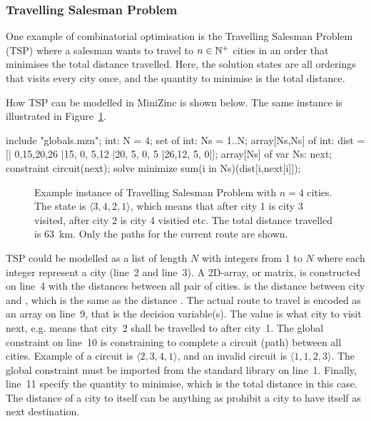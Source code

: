 \documentclass[a4paper,12pt]{article}
\begin{document}
\subsubsection{Travelling Salesman Problem}\label{sec:tsp}

One example of combinatorial optimisation is the Travelling Salesman Problem (TSP) where a
salesman wants to travel to $n \in \mathbb{N}^+$ cities in an order that minimises the total
distance travelled. Here, the solution states are all orderings that visits every city once, and the
quantity to minimise is the total distance.

How TSP can be modelled in MiniZinc is shown below.
The same instance is illustrated in Figure~\ref{fig:tsp}.
\begin{mznbreak}
include "globals.mzn";
int: N = 4;
set of int: Ns = 1..N;
array[Ns,Ns] of int: dist =
  [| 0,15,20,26
   |15, 0, 5,12
   |20, 5, 0, 5
   |26,12, 5, 0|];
array[Ns] of var Ns: next;
constraint circuit(next);
solve minimize sum(i in Ns)(dist[i,next[i]]);
\end{mznbreak}

\begin{figure}[ht]
  \centering
  
  \caption{Example instance of Travelling Salesman Problem with $n=4$ cities. The state is
    $\langle 3,4,2,1 \rangle$, which means that after city 1 is city 3 visited, after
    city 2 is city 4 visitied etc. The total distance travelled is \SI{63}{km}. Only the
    paths for the current route are shown.}%
  \label{fig:tsp}
\end{figure}

TSP could be modelled as a list of length $N$ with integers from 1 to $N$
where each integer represent a city (line~2 and line~3).
A 2D-array, or matrix, is constructed on line~4 with the distances between all pair of cities.
 is the distance between
city  and , which is the same as the distance . The actual
route to travel is encoded as an array on line~9, that is the decision variable(s). The
value  is what city to visit next, e.g.\@ {} means that city~2
shall be travelled to after city~1. The global constraint  on line~10 is
constraining  to complete a circuit (path) between all cities. Example of a
circuit is $\langle 2,3,4,1 \rangle$, and an invalid circuit is $\langle 1,1,2,3 \rangle$. The global
constraint must be imported from the standard library on line~1. Finally, line~11 specify
the quantity to minimise, which is the total distance in this case. The distance of a city
to itself can be anything as  prohibit a city to have itself as next destination.
\end{document}
